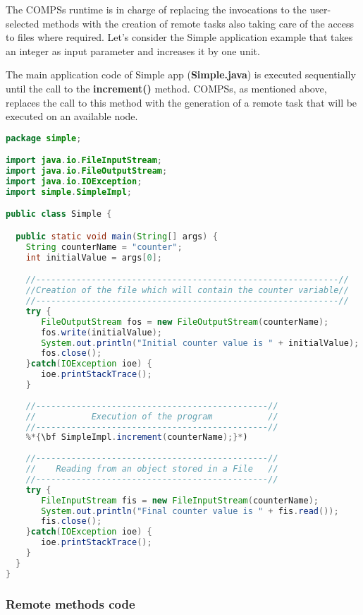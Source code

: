 The COMPSs runtime is in charge of replacing the invocations to the user-selected methods with the
creation of remote tasks also taking care of the access to files where required. 
Let's consider the Simple application example that takes an integer as input parameter and increases it by one unit.

The main application code of Simple app ({\bf Simple.java}) is executed sequentially until the call to the
{\bf increment()} method. COMPSs, as mentioned above, replaces the call to this method with the generation of a remote task that will be executed on an available node.

\begin{lstlisting}[language=java]
package simple;

import java.io.FileInputStream;
import java.io.FileOutputStream;
import java.io.IOException;
import simple.SimpleImpl;

public class Simple {

  public static void main(String[] args) {
    String counterName = "counter";
    int initialValue = args[0];

    //------------------------------------------------------------//
    //Creation of the file which will contain the counter variable//
    //------------------------------------------------------------//
    try {
       FileOutputStream fos = new FileOutputStream(counterName);
       fos.write(initialValue);
       System.out.println("Initial counter value is " + initialValue);
       fos.close();
    }catch(IOException ioe) {
       ioe.printStackTrace();
    }
    
    //----------------------------------------------//
    //           Execution of the program           //
    //----------------------------------------------//
    %*{\bf SimpleImpl.increment(counterName);}*)
    
    //----------------------------------------------//
    //    Reading from an object stored in a File   //
    //----------------------------------------------//
    try {
       FileInputStream fis = new FileInputStream(counterName);
       System.out.println("Final counter value is " + fis.read());
       fis.close();
    }catch(IOException ioe) {
       ioe.printStackTrace();
    }
  }
}
\end{lstlisting}

\vspace{-0.1cm}

\subsubsection{Remote methods code}

